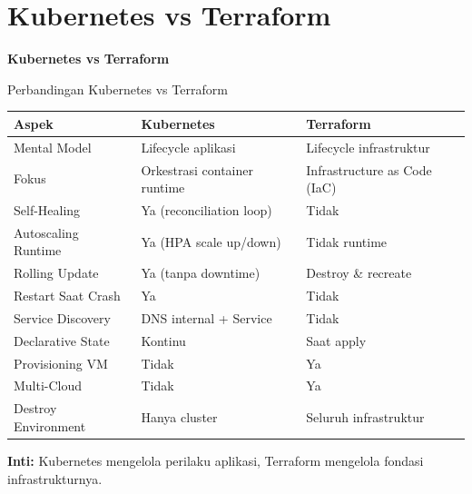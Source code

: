 \documentclass[aspectratio=169, table]{beamer}
\begin{document}
\section{Kubernetes vs Terraform}
\begin{frame}{\hfill}
	\centering
	\Huge{\textbf{Kubernetes vs Terraform}}
\end{frame}

\begin{frame}{Perbandingan Kubernetes vs Terraform}
\vspace{10pt}
\footnotesize
{}
\begin{tabular}{|p{}|p{}|p{}|}
\hline
\textbf{Aspek} & \textbf{Kubernetes} & \textbf{Terraform} \\
\hline
Mental Model & Lifecycle aplikasi & Lifecycle infrastruktur \\
\hline
Fokus & Orkestrasi container runtime & Infrastructure as Code (IaC) \\
\hline
Self-Healing & Ya (reconciliation loop) & Tidak \\
\hline
Autoscaling Runtime & Ya (HPA scale up/down) & Tidak runtime \\
\hline
Rolling Update & Ya (tanpa downtime) & Destroy \& recreate \\
\hline
Restart Saat Crash & Ya & Tidak \\
\hline
Service Discovery & DNS internal + Service & Tidak \\
\hline
Declarative State & Kontinu & Saat apply \\
\hline
Provisioning VM & Tidak & Ya \\
\hline
Multi-Cloud & Tidak & Ya \\
\hline
Destroy Environment & Hanya cluster & Seluruh infrastruktur \\
\hline
\end{tabular}

\vspace{6pt}
\textbf{Inti:} Kubernetes mengelola perilaku aplikasi, 
Terraform mengelola fondasi infrastrukturnya.
\end{frame}

\end{document}
